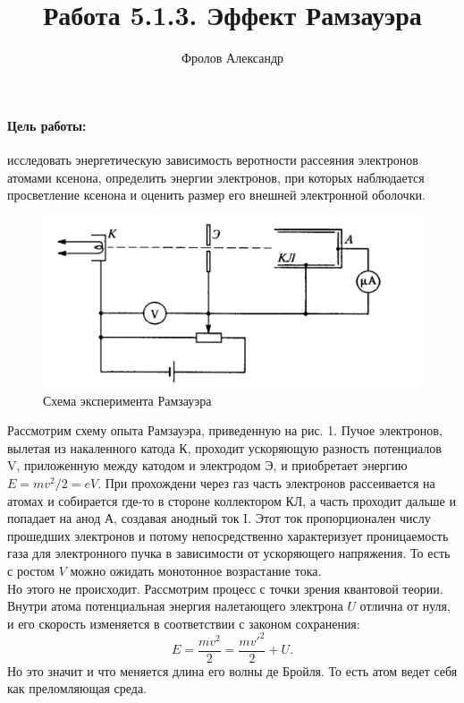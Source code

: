 \documentclass[11pt]{article}
\begin{document}
  \title{Работа 5.1.3. Эффект Рамзауэра}
  \author{Фролов Александр}
  \date{}
  \maketitle
  
  \paragraph{Цель работы:}исследовать энергетическую зависимость веротности рассеяния электронов атомами ксенона, определить энергии электронов, при которых наблюдается просветление ксенона и оценить размер его внешней электронной оболочки. \\
  \par
     \begin{figure}[H]
\centering
\includegraphics[width=0.95\linewidth]{ramz.png}
\caption{Схема эксперимента Рамзауэра}
\end{figure}
  Рассмотрим схему опыта Рамзауэра, приведенную на рис. 1. Пучое электронов, вылетая из накаленного катода К, проходит ускоряющую разность потенциалов V, приложенную между катодом и электродом Э, и приобретает энергию $E = mv^2/2 = eV$. При прохождени через газ часть электронов рассеивается на атомах и собирается где-то в стороне коллектором КЛ, а часть проходит дальше и попадает на анод А, создавая анодный ток I. Этот ток пропорционален числу прошедших электронов и потому непосредственно характеризует проницаемость газа для электронного пучка в зависимости от ускоряющего напряжения. То есть с ростом $V$ можно ожидать монотонное возрастание тока.
  \\
  Но этого не происходит. Рассмотрим процесс с точки зрения квантовой теории. Внутри атома потенциальная энергия налетающего электрона $U$ отлична от нуля, и его скорость изменяется в соответствии с законом сохранения:
  \[
   E = \frac{mv^2}{2} = \frac{mv'^2}{2} + U.
  \]
  Но это значит и что меняется длина его волны де Бройля. То есть атом ведет себя как преломляющая среда. \\
\end{document}
